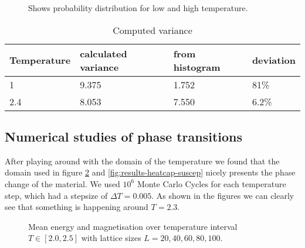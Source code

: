\documentclass[../main.tex]{subfiles}
\begin{document}
\begin{figure}[!h]
  \centering
  \caption{Shows probability distribution for low and high temperature.}
  \label{fig:results-ProbE_T24}
\end{figure}
\FloatBarrier


\begin{table}[!h]
  \begin{center}
    \begin{tabular}{|l| l| l| l|}
      \hline
      Temperature & calculated variance & from histogram & deviation\\
      \hline
      1 & 9.375 & 1.752 & 81\%\\
      2.4 & 8.053  & 7.550 & 6.2\%\\
      \hline
    \end{tabular}
    \caption{Computed variance}
    \label{tab:results-variance}
  \end{center}
\end{table}
\FloatBarrier

\subsection{Numerical studies of phase transitions}
After playing around with the domain of the temperature we found that the domain used in figure \ref{fig:results-energy-magnetisation} and \ref{fig:results-heatcap-suscep} nicely presents the phase change of the material. We used $10^6$ Monte Carlo Cycles for each temperature step, which had a stepsize of $\Delta T = 0.005$. As shown in the figures we can clearly see that something is happening around $T = 2.3$.

\begin{figure}[!h]
  \caption{Mean energy and magnetisation over temperature interval $T \in [2.0, 2.5]$ with lattice sizes $L = {20, 40, 60, 80, 100}$.}
  \label{fig:results-energy-magnetisation}
\end{figure}
\FloatBarrier
\end{document}
